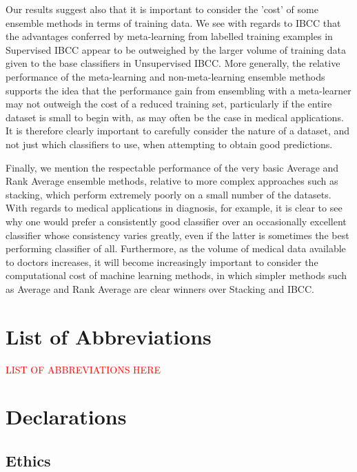 \documentclass{document}
\begin{document}
\vspace{0.2cm}
\noindent
Our results suggest also that it is important to consider the 'cost' of some ensemble methods in terms of training data. We see with regards to IBCC that the advantages conferred by meta-learning from labelled training examples in Supervised IBCC appear to be outweighed by the larger volume of training data given to the base classifiers in Unsupervised IBCC. More generally, the relative performance of the meta-learning and non-meta-learning ensemble methods supports the idea that the performance gain from ensembling with a meta-learner may not outweigh the cost of a reduced training set, particularly if the entire dataset is small to begin with, as may often be the case in medical applications. It is therefore clearly important to carefully consider the nature of a dataset, and not just which classifiers to use, when attempting to obtain good predictions.

\vspace{0.2cm}
\noindent
Finally, we mention the respectable performance of the very basic Average and Rank Average ensemble methods, relative to more complex approaches such as stacking, which perform extremely poorly on a small number of the datasets. With regards to medical applications in diagnosis, for example, it is clear to see why one would prefer a consistently good classifier over an occasionally excellent classifier whose consistency varies greatly, even if the latter is sometimes the best performing classifier of all. Furthermore, as the volume of medical data available to doctors increases, it will become increasingly important to consider the computational cost of machine learning methods, in which simpler methods such as Average and Rank Average are clear winners over Stacking and IBCC.

\vspace{-5mm}

\section{List of Abbreviations}
\textcolor{red}{LIST OF ABBREVIATIONS HERE}

\section{Declarations}
	
	\subsection{Ethics}
\end{document}
